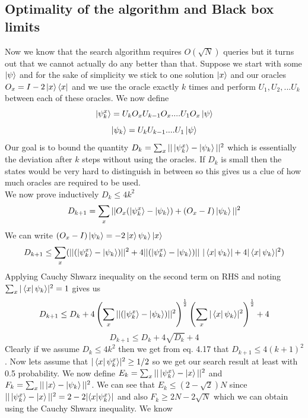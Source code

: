\documentclass{report}
\begin{document}
\subsection{Optimality of the algorithm and Black box limits}
Now we know that the search algorithm requires $O(\sqrt{N})$ queries but it turns out that we cannot actually do any better than that. Suppose we start with some $\ket{\psi}$ and for the sake of simplicity we stick to one solution $\ket{x}$ and our oracles $O_x = I - 2\ket{x}\bra{x}$ and we use the oracle exactly $k$ times and perform $U_1,U_2,...U_k$ between each of these oracles. We now define 
\begin{equation}\ket{\psi_{k}^{x}} = U_{k}O_{x}U_{k-1}O_{x}....U_{1}O_x\ket{\psi}\end{equation}
\begin{equation}\ket{\psi_{k}} = U_{k}U_{k-1}....U_{1}\ket{\psi}\end{equation}
Our goal is to bound the quantity $D_k = \sum_{x}||\ket{\psi_{k}^{x}} - \ket{\psi_{k}}||^2$ which is essentially the deviation after $k$ steps without using the oracles. If $D_k$ is small then the states would be very hard to distinguish in between so this gives us a clue of how much oracles are required to be used.\\
We now prove inductively $D_k \leq 4k^2$
\begin{equation}D_{k+1} = \sum_{x}||O_x(\ket{\psi_{k}^{x}} - \ket{\psi_{k}}) + (O_x - I)\ket{\psi_k}||^2\end{equation}
We can write $(O_x - I)\ket{\psi_k} = -2\ket{x}{\psi_k}\rangle\ket{x}$
\begin{equation}D_{k+1} \leq \sum_{x}(||(\ket{\psi_{k}^{x}} - \ket{\psi_{k}})||^2 + 4||(\ket{\psi_{k}^{x}} - \ket{\psi_{k}})||\text{ }|\bra{x}{\psi_k}\rangle| + 4|\bra{x}{\psi_k}\rangle|^2)\end{equation}
Applying Cauchy Shwarz inequality on the second term on RHS and noting $\sum_{x}|\bra{x}{\psi_k}\rangle|^2 = 1$ gives us
\begin{equation}D_{k+1} \leq D_k + 4\left(\sum_{x}||(\ket{\psi_{k}^{x}} - \ket{\psi_{k}})||^2\right)^{\frac{1}{2}}\left(\sum_{x}|\bra{x}{\psi_k}\rangle|^2\right)^{\frac{1}{2}} + 4\end{equation}
\begin{equation}D_{k+1} \leq D_k + 4\sqrt{D_k} + 4\end{equation}
Clearly if we assume $D_k \leq 4k^2$ then we get from eq. 4.17 that $D_{k+1} \leq 4(k+1)^2$. Now lets assume that $|\bra{x}\psi_{k}^{x}\rangle|^2 \geq 1/2$ so we get our search result at least with 0.5 probability. We now define $E_k = \sum_x||\ket{\psi_{k}^x} - \ket{x}||^2$ and $F_k = \sum_x||\ket{x} - \ket{\psi_k}||^2$. We can see that $E_k \leq (2 - \sqrt{2})N$ since $||\ket{\psi_{k}^x} - \ket{x}||^2 = 2 - 2|\langle{x}|\psi_{k}^{x}\rangle|$ and also $F_k \geq 2N - 2\sqrt{N}$ which we can obtain using the Cauchy Shwarz inequality. We know
\end{document}
